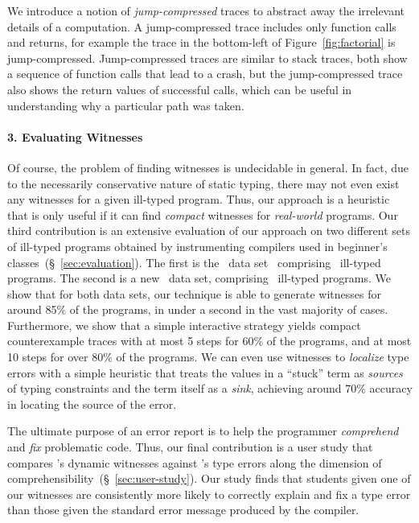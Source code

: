 We introduce a notion of \emph{jump-compressed} traces to abstract away
the irrelevant details of a computation.
%
A jump-compressed trace includes only function
calls and returns, for example the trace in the bottom-left of
Figure~\ref{fig:factorial} is jump-compressed.
%
Jump-compressed traces are similar to stack traces, both show a
sequence of function calls that lead to a crash, but the jump-compressed
trace also shows the return values of successful calls, which can be
useful in understanding why a particular path was taken.

\paragraph{3. Evaluating Witnesses}
%
Of course, the problem of finding witnesses is
undecidable in general. In fact, due to the necessarily
conservative nature of static typing, there
may not even exist any witnesses for a given
ill-typed program.
%
Thus, our approach is a heuristic that is only useful
if it can find \emph{compact} witnesses for
\emph{real-world} programs.
%
Our third contribution is an extensive evaluation of our approach
on two different sets of ill-typed programs obtained by instrumenting
compilers used in beginner's classes~(\S~\ref{sec:evaluation}).
%
The first is the \uwbench\ data set~\cite{Lerner2007-dt}
comprising \uwsize\ ill-typed programs.
%
The second is a new \ucsdbench\ data set, comprising \ucsdsize\
ill-typed programs.
%
We show that for both data sets, our technique is able to generate
witnesses for around 85\% of the programs, in under a second in the
vast majority of cases.
%
Furthermore, we show that a simple interactive strategy yields
compact counterexample traces with at most 5 steps for 60\%
of the programs, and at most 10 steps for over 80\% of the programs.
%
We can even use witnesses to \emph{localize} type errors with a simple
heuristic that treats the values in a ``stuck'' term as \emph{sources}
of typing constraints and the term itself as a \emph{sink},
achieving around 70\% accuracy in locating the source of the error.

The ultimate purpose of an error report is to help the programmer
\emph{comprehend} and \emph{fix} problematic code.
%
Thus, our final contribution is a user study that compares \toolname's
dynamic witnesses against \ocaml's type errors along the dimension of
comprehensibility~(\S~\ref{sec:user-study}).
%
Our study finds that students given one of our witnesses are
consistently more likely to correctly explain and fix a type
error than those given the standard error message produced by
the \ocaml compiler.


